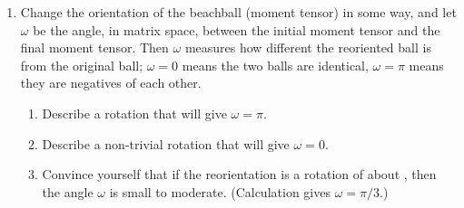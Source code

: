 \documentclass[11pt,titlepage,fleqn]{article}
\begin{document}
\begin{enumerate}

\item Change the orientation of the beachball (moment tensor) in some way, and let $\omega$ be the angle, in matrix space, between the initial moment tensor and the final moment tensor. Then $\omega$ measures how different the reoriented ball is from the original ball; $\omega=0$ means the two balls are identical, $\omega=\pi$ means they are negatives of each other.

\begin{enumerate}
\item Describe a rotation that will give $\omega=\pi$.

\item Describe a non-trivial rotation that will give $\omega=0$.

\item Convince yourself that if the reorientation is a rotation of  about \mbT, then the angle $\omega$ is small to moderate. (Calculation gives $\omega=\pi/3$.)

\end{enumerate}







\end{enumerate}
\end{document}
